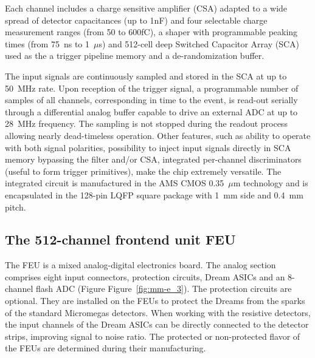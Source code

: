 Each channel includes a charge sensitive amplifier (CSA) adapted to a wide spread of detector capacitances (up to 1nF) and four selectable charge measurement ranges (from 50 to 600fC), a shaper with programmable peaking times (from 75~ns to 1~$\mu$s) and 512-cell deep Switched Capacitor Array (SCA) used as the a trigger pipeline memory and a de-randomization buffer.

The input signals are continuously sampled and stored in the SCA at up to 50~MHz rate. Upon reception of the trigger signal, a programmable number of samples of all channels, corresponding in time to the event, is read-out serially through a differential analog buffer capable to drive an external ADC at up to 28~MHz frequency. The sampling is not stopped during the readout process allowing nearly dead-timeless operation.
Other features, such as ability to operate with both signal polarities, possibility to inject input signals directly in SCA memory bypassing the filter and/or CSA, integrated per-channel discriminators (useful to form trigger primitives), make the chip extremely versatile. The integrated circuit is manufactured in the AMS CMOS 0.35~$\mu$m technology and is encapsulated in the 128-pin LQFP square package with 1~mm side and 0.4~mm pitch.

\subsection{The 512-channel frontend unit FEU}
The FEU is a mixed analog-digital electronics board. The analog section comprises eight input connectors, protection circuits, Dream ASICs and an 8-channel flash ADC (Figure Figure~\ref{fig:mm-e_3}). The protection circuits are optional.  They are installed on the FEUs to protect the Dreams from the sparks of the standard Micromegas detectors. When working with the resistive detectors, the input channels of the Dream ASICs can be directly connected to the detector strips, improving signal to noise ratio. The protected or non-protected flavor of the FEUs are determined during their manufacturing.

